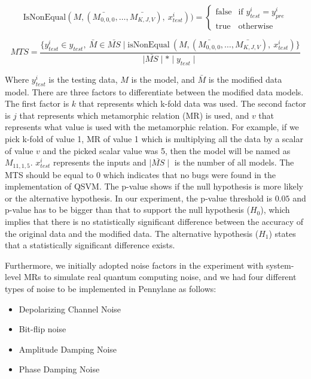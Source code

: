 \documentclass[12pt,a4paper]{article}
\begin{document}
	\[
	\text{IsNonEqual}(M, (\bar{M_{0,0,0}}, \ldots, \bar{M_{K,J,V}}),\ x_{test}^i)) =
	\begin{cases} 
		\text{false} & \text{if } y^i_{test} = y^i_{pre} 
		\\
		\text{true} & \text{otherwise}
	\end{cases}
	\]
	
	\begin{equation}
		\label{eq:MTS}
		MTS = \frac{\{y^i_{test} \in y_{test},\ {\bar{M}} \in \bar{MS} \mid \text{isNonEqual} \ (M, (\bar{M_{0,0,0}}, \ldots, \bar{M_{K,J,V}}),\ x_{test}^i)\}}{\mid \bar{MS} \mid * \mid y_{test} \mid} 
	\end{equation}
	
	Where $y^i_{test}$ is the testing data, $M$ is the model, and $\bar{M}$ is the modified data model. There are three factors to differentiate between the modified data models. The first factor is $k$ that represents which k-fold data was used. The second factor is $j$ that represents which metamorphic relation (MR) is used, and $v$ that represents what value is used with the metamorphic relation. For example, if we pick k-fold of value 1, MR of value 1 which is multiplying all the data by a scalar of value $v$ and the picked scalar value was 5, then the model will be named as $M_{11,1,5}$. $x^i_{test}$ represents the inputs and $\mid \bar{MS} \mid$ is the number of all models. The MTS should be equal to 0 which indicates that no bugs were found in the implementation of QSVM. The p-value shows if the null hypothesis is more likely or the alternative hypothesis. In our experiment, the p-value threshold is $0.05$ and p-value has to be bigger than that to support the null hypothesis ($H_0$), which implies that there is no statistically significant difference between the accuracy of the original data and the modified data. The alternative hypothesis ($H_1$) states that a statistically significant difference exists.
	
	Furthermore, we initially adopted noise factors in the experiment with system-level MRs to simulate real quantum computing noise, and we had four different types of noise to be implemented in Pennylane as follows:
	\begin{itemize}
		\item Depolarizing Channel Noise
		\item Bit-flip noise
		\item Amplitude Damping Noise
		\item Phase Damping Noise
	\end{itemize}
	
\end{document}
